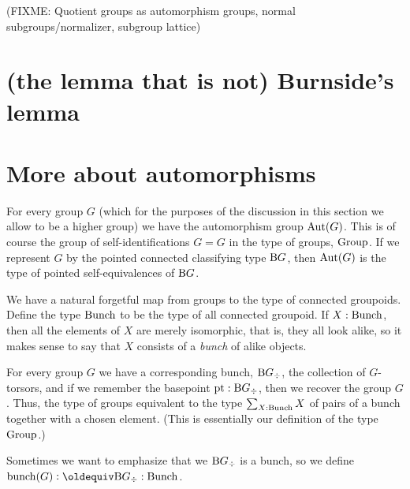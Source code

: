 (FIXME: Quotient groups as automorphism groups, normal subgroups/normalizer, subgroup lattice)


\section{(the lemma that is not) Burnside's lemma}
\label{sec:burnsides-lemma}

\section{More about automorphisms}
\label{sec:automorphisms}

For every group $G$ (which for the purposes of the discussion
in this section we allow to be a higher group)
we have the automorphism group $\operatorname{Aut}(G)$.
This is of course the group of self-identifications $G = G$ in the type of groups, $\mathord{\mathrm{Group}}$.
If we represent $G$ by the pointed connected classifying type $\mathrm B G$,
then $\operatorname{Aut}(G)$ is the type of pointed self-equivalences of $\mathrm B G$.

We have a natural forgetful map from groups to the type of connected groupoids.
Define the type $\mathord{\mathrm{Bunch}}$ to be the type of all connected groupoid.
If $X:\mathord{\mathrm{Bunch}}$, then all the elements of $X$ are merely isomorphic,
that is, they all look alike,
so it makes sense to say that $X$ consists of a \emph{bunch} of alike objects.

For every group $G$ we have a corresponding bunch, $\mathrm B G_\div$,
\ie{} the collection of $G$-torsors,
and if we remember the basepoint ${\mathord{\mathrm{pt}}} : \mathrm B G_\div$,
then we recover the group $G$.
Thus, the type of groups equivalent to the type
$\sum_{X : \mathord{\mathrm{Bunch}}} X$
of pairs of a bunch together with a chosen element.
(This is essentially our definition of the type $\mathord{\mathrm{Group}}$.)

Sometimes we want to emphasize that we $\mathrm B G_\div$ is a bunch,
so we define $\bunch(G) \defeq \B G_\div : \Bunch$.

